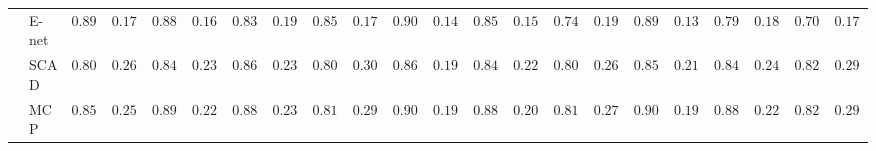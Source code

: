 \begin{tabular}{p{0.2cm}p{1cm}|p{0.6cm}p{0.6cm}|p{0.6cm}p{0.6cm}p{0.6cm}p{0.6cm}p{0.6cm}p{0.6cm}|p{0.6cm}p{0.6cm}p{0.6cm}p{0.6cm}p{0.6cm}p{0.6cm}|p{0.6cm}p{0.6cm}p{0.6cm}p{0.6cm}p{0.6cm}p{0.6cm}}
 & E-net  & $0.8983$ & $0.1739$ & $0.8867$ & $0.1656$ & $0.8317$ & $0.1932$ & $0.8533$ & $0.1745$ & $0.9017$ & $0.1423$ & $0.8533$ & $0.1558$ & $0.7417$ & $0.1901$ & $0.8983$ & $0.1399$ & $0.7950$ & $0.1817$ & $0.7083$ & $0.1794$ \\
 & SCAD  & $0.8017$ & $0.2624$ & $0.8467$ & $0.2389$ & $0.8617$ & $0.2346$ & $0.8067$ & $0.3095$ & $0.8650$ & $0.1963$ & $0.8400$ & $0.2209$ & $0.8000$ & $0.2670$ & $0.8567$ & $0.2171$ & $0.8433$ & $0.2425$ & $0.8250$ & $0.2943$ \\
 & MCP  & $0.8567$ & $0.2518$ & $0.8917$ & $0.2289$ & $0.8817$ & $0.2349$ & $0.8183$ & $0.2969$ & $0.9083$ & $0.1944$ & $0.8833$ & $0.2017$ & $0.8100$ & $0.2773$ & $0.9067$ & $0.1929$ & $0.8850$ & $0.2281$ & $0.8233$ & $0.2957$ \\
\hline 
\end{tabular}

